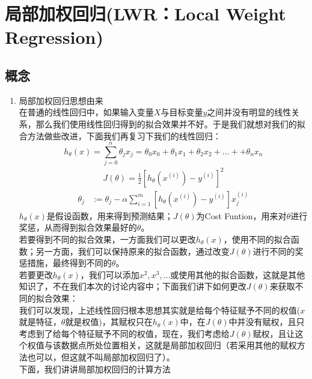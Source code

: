 \section{局部加权回归(LWR：Local Weight Regression)}
\subsection{概念}
\begin{enumerate}
	\item 局部加权回归思想由来 \\
	在普通的线性回归中，如果输入变量$X$与目标变量$y$之间并没有明显的线性关系，那么我们使用线性回归得到的拟合效果并不好。于是我们就想对我们的拟合方法做些改进，下面我们再复习下我们的线性回归：
	\begin{equation}
		h_{\theta}(x) = \sum_{j=0}^n \theta_jx_j = \theta_0x_0 + \theta_1x_1 + \theta_2x_2 + \dots +  + \theta_nx_n
	\end{equation}
	\begin{equation}\begin{aligned}
		J(\theta) = \frac{1}{2} \left[h_{\theta} {(x^{(i)})} - y^{(i)}\right]^2
	\end{aligned}\end{equation}
	\begin{equation}\begin{aligned}
		\theta_j &:= \theta_j - \alpha \sum_{i=1}^m \left[ h_\theta(x^{(i)}) - y^{(i)} \right]x_j^{(i)}
	\end{aligned}\end{equation}
	$h_\theta(x)$是假设函数，用来得到预测结果；$J(\theta)$为Cost Funtion，用来对$\theta$进行奖惩，从而得到拟合效果最好的$\theta$。\\
	若要得到不同的拟合效果，一方面我们可以更改$h_\theta(x)$，使用不同的拟合函数；另一方面，我们可以保持原来的拟合函数，通过改变$J(\theta)$进行不同的奖惩措施，最终得到不同的$\theta$。\\
	若要更改$h_\theta(x)$，我们可以添加$x^2, x^3, \dots$或使用其他的拟合函数，这就是其他知识了，不在我们本次的讨论内容中；下面我们讲下如何更改$J(\theta)$来获取不同的拟合效果：\\
	我们可以发现，上述线性回归根本思想其实就是给每个特征赋予不同的权值($x$就是特征，$\theta$就是权值)，其赋权只在$h_\theta(x)$中，在$J(\theta)$中并没有赋权，且只考虑到了给每个特征赋予不同的权值，现在，我们考虑给$J(\theta)$赋权，且让这个权值与该数据点所处位置相关，这就是局部加权回归（若采用其他的赋权方法也可以，但这就不叫局部加权回归了）。\\
	下面，我们讲讲局部加权回归的计算方法
\end{enumerate}

